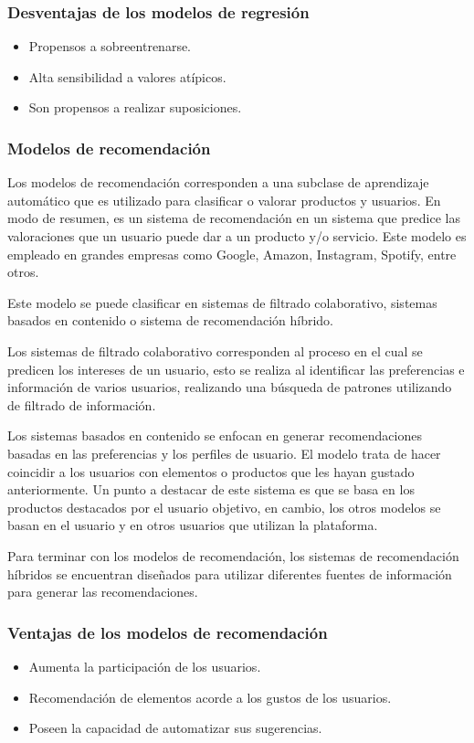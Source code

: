 \subsubsection{Desventajas de los modelos de regresión}

\begin{itemize}
    \item Propensos a sobreentrenarse.
    \item Alta sensibilidad a valores atípicos.
    \item Son propensos a realizar suposiciones.
\end{itemize}

\subsubsection{Modelos de recomendación}
Los modelos de recomendación corresponden a una subclase de aprendizaje automático que es utilizado para clasificar o valorar productos y usuarios. En modo de resumen, es un sistema de recomendación en un sistema que predice las valoraciones que un usuario puede dar a un producto y/o servicio. Este modelo es empleado en grandes empresas como Google, Amazon, Instagram, Spotify, entre otros.

Este modelo se puede clasificar en sistemas de filtrado colaborativo, sistemas basados en contenido o sistema de recomendación híbrido.

Los sistemas de filtrado colaborativo corresponden al proceso en el cual se predicen los intereses de un usuario, esto se realiza al identificar las preferencias e información de varios usuarios, realizando una búsqueda de patrones utilizando de filtrado de información.

Los sistemas basados en contenido se enfocan en generar recomendaciones basadas en las preferencias y los perfiles de usuario. El modelo trata de hacer coincidir a los usuarios con elementos o productos que les hayan gustado anteriormente. Un punto a destacar de este sistema es que se basa en los productos destacados por el usuario objetivo, en cambio, los otros modelos se basan en el usuario y en otros usuarios que utilizan la plataforma.

Para terminar con los modelos de recomendación, los sistemas de recomendación híbridos se encuentran diseñados para utilizar diferentes fuentes de información para generar las recomendaciones. 

\subsubsection{Ventajas de los modelos de recomendación}
\begin{itemize}
    \item Aumenta la participación de los usuarios.
    \item Recomendación de elementos acorde a los gustos de los usuarios.
    \item Poseen la capacidad de automatizar sus sugerencias.
\end{itemize}

